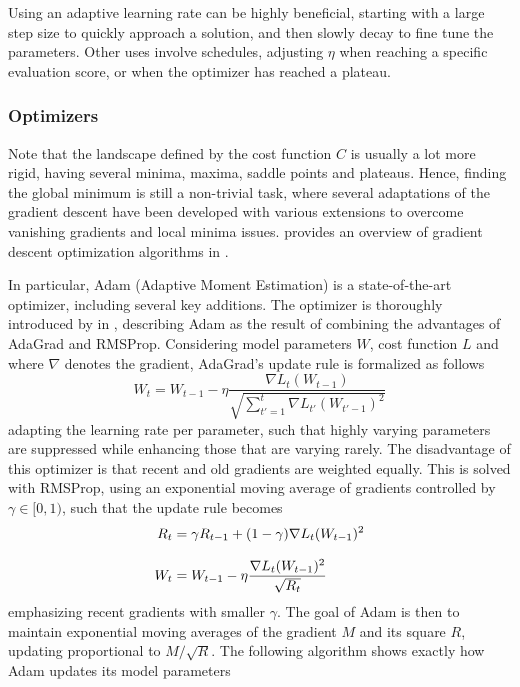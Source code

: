         Using an adaptive learning rate can be highly beneficial, starting with a large step size to quickly approach a solution, and then slowly decay to fine tune the parameters. Other uses involve schedules, adjusting $\eta$ when reaching a specific evaluation score, or when the optimizer has reached a plateau.
    
    \subsubsection{Optimizers}
    
        Note that the landscape defined by the cost function $C$ is usually a lot more rigid, having several minima, maxima, saddle points and plateaus. Hence, finding the global minimum is still a non-trivial task, where several adaptations of the gradient descent have been developed with various extensions to overcome vanishing gradients and local minima issues. 
        \citeauthor{ruder2017overview} provides an overview of gradient descent optimization algorithms in \cite{ruder2017overview}.
        
        In particular, Adam (Adaptive Moment Estimation) is a state-of-the-art optimizer, including several key additions. The optimizer is thoroughly introduced by \citeauthor{kingma2017adam} in \cite{kingma2017adam}, describing Adam as the result of combining the advantages of AdaGrad and RMSProp. Considering model parameters $W$, cost function $L$ and where $\nabla$ denotes the gradient, AdaGrad's update rule is formalized as follows
        \begin{equation}
            W_t = W_{t-1} - \eta \frac{\nabla L_t(W_{t-1})}{\sqrt{\sum_{t'=1}^t\nabla L_{t'}(W_{t'-1})^2}}
        \end{equation}
        adapting the learning rate per parameter, such that highly varying parameters are suppressed while enhancing those that are varying rarely. The disadvantage of this optimizer is that recent and old gradients are weighted equally. This is solved with RMSProp, using an exponential moving average of gradients controlled by $\gamma \in [0,1)$, such that the update rule becomes
        \begin{align}
            R_t &= \gamma R_{t-1}+(1-\gamma)\nabla L_t(W_{t-1})^2 \\[.5\baselineskip]
            W_t &= W_{t-1} - \eta \frac{\nabla L_t(W_{t-1})^2}{\sqrt{R_t}}
        \end{align}
        emphasizing recent gradients with smaller $\gamma$. The goal of Adam is then to maintain exponential moving averages of the gradient $M$ and its square $R$, updating proportional to $M / \sqrt{R}$. The following algorithm shows exactly how Adam updates its model parameters
        
